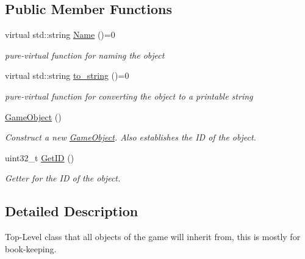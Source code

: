 \subsection*{Public Member Functions}
\begin{DoxyCompactItemize}
\item 
\mbox{\label{classgame_1_1objects_1_1GameObject_abc967efcbc66ec93c8592ad785aeb953}} 
virtual std\+::string \hyperlink{classgame_1_1objects_1_1GameObject_abc967efcbc66ec93c8592ad785aeb953}{Name} ()=0
\begin{DoxyCompactList}\small\item\em pure-\/virtual function for naming the object \end{DoxyCompactList}\item 
\mbox{\label{classgame_1_1objects_1_1GameObject_a59faf4c33c2c0d8a9d52a26029d1488f}} 
virtual std\+::string \hyperlink{classgame_1_1objects_1_1GameObject_a59faf4c33c2c0d8a9d52a26029d1488f}{to\+\_\+string} ()=0
\begin{DoxyCompactList}\small\item\em pure-\/virtual function for converting the object to a printable string \end{DoxyCompactList}\item 
\mbox{\label{classgame_1_1objects_1_1GameObject_a52cb48890e7b64e25ebb1fb87ddd3551}} 
\hyperlink{classgame_1_1objects_1_1GameObject_a52cb48890e7b64e25ebb1fb87ddd3551}{Game\+Object} ()
\begin{DoxyCompactList}\small\item\em Construct a new \hyperlink{classgame_1_1objects_1_1GameObject}{Game\+Object}. Also establishes the ID of the object. \end{DoxyCompactList}\item 
uint32\+\_\+t \hyperlink{classgame_1_1objects_1_1GameObject_a1fb35a5a82dee7aefe112b81bda8b2c4}{Get\+ID} ()
\begin{DoxyCompactList}\small\item\em Getter for the ID of the object. \end{DoxyCompactList}\end{DoxyCompactItemize}


\subsection{Detailed Description}
Top-\/\+Level class that all objects of the game will inherit from, this is mostly for book-\/keeping. 

